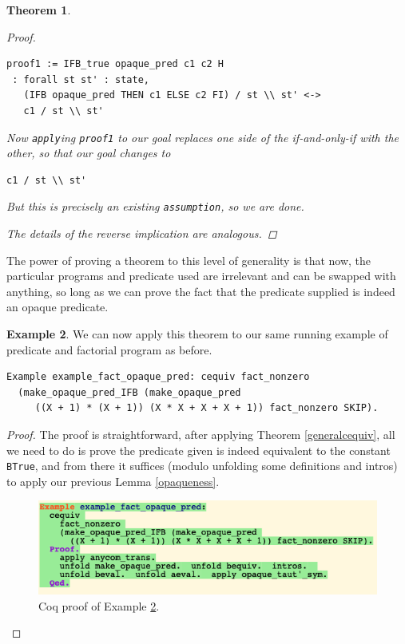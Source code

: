 \documentclass[12pt,notitlepage]{report}
\theoremstyle{plain}
\newtheorem{theo}{Theorem}[section]
\theoremstyle{definition}
\newtheorem{example}[theo]{Example}
\numberwithin{equation}{section}
\begin{document}
\begin{theo}
\begin{proof}
\begin{verbatim}
proof1 := IFB_true opaque_pred c1 c2 H
 : forall st st' : state,
   (IFB opaque_pred THEN c1 ELSE c2 FI) / st \\ st' <->
   c1 / st \\ st'
\end{verbatim}
Now \verb$apply$ing \verb$proof1$ to our goal replaces one side of the if-and-only-if with the other, so that our goal changes to
\begin{verbatim}
c1 / st \\ st'
\end{verbatim}
But this is precisely an existing \verb$assumption$, so we are done.
\par The details of the reverse implication are analogous.
\end{proof}
\end{theo}

The power of proving a theorem to this level of generality is that now, the particular programs and predicate used are irrelevant and can be swapped with anything, so long as we can prove the fact that the predicate supplied is indeed an opaque predicate.

\begin{example}\label{factopaqueex}
We can now apply this theorem to our same running example of predicate and factorial program as before.
\begin{verbatim}Example example_fact_opaque_pred: cequiv fact_nonzero 
  (make_opaque_pred_IFB (make_opaque_pred 
     ((X + 1) * (X + 1)) (X * X + X + X + 1)) fact_nonzero SKIP).
\end{verbatim}
\begin{proof}
    The proof is straightforward, after applying Theorem \ref{generalcequiv}, all we need to do is prove the predicate given is indeed equivalent to the constant \verb$BTrue$, and from there it suffices (modulo unfolding some definitions and intros) to apply our previous Lemma \eqref{opaqueness}.
    
\noindent        \begin{figure}[H]
        \centering
        \includegraphics[scale=0.6]{fact_eg}
        \caption{Coq proof of Example \ref{factopaqueex}.}
        \label{fig:factopaqueex}
        \end{figure}
\end{proof}
\end{example}
\end{document}
